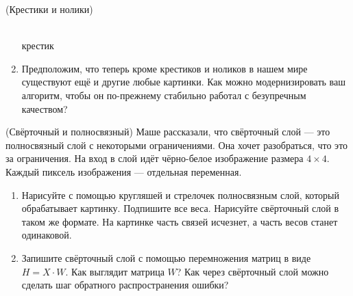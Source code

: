 \begin{problem}{(Крестики и нолики)}
\begin{enumerate}
\begin{minipage}{0.22\linewidth}
        \\ крестик 
    \end{minipage}
    
    \item  Предположим, что теперь кроме крестиков и ноликов в нашем мире существуют ещё и другие любые картинки. Как можно модернизировать ваш алгоритм, чтобы он по-прежнему стабильно работал с безупречным качеством? 
\end{enumerate} 
\end{problem}

\begin{problem}{(Свёрточный и полносвязный)}
Маше рассказали, что свёрточный слой --- это полносвязный слой с некоторыми ограничениями. Она хочет разобраться, что это за ограничения. На вход в слой идёт чёрно-белое изображение размера $4 \times 4.$ Каждый пиксель изображения --- отдельная переменная.
    \begin{enumerate} 
        \item Нарисуйте с помощью кругляшей и стрелочек полносвязным слой, который обрабатывает картинку. Подпишите все веса. Нарисуйте свёрточный слой в таком же формате. На картинке часть связей исчезнет, а часть весов станет одинаковой. 
    
        \item Запишите свёрточный слой с помощью перемножения матриц в виде $H = X \cdot W.$ Как выглядит матрица $W$? Как через свёрточный слой можно сделать шаг обратного распространения ошибки? 
    \end{enumerate} 
\end{problem}


